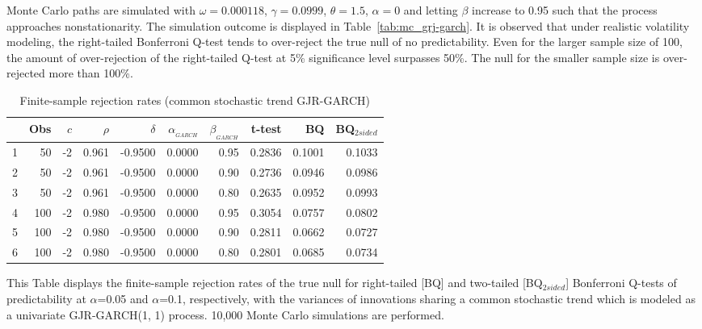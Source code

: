 \documentclass{article}
\begin{document}
Monte Carlo paths are simulated with $\omega = 0.000118$, $\gamma=0.0999$, $\theta=1.5$, $\alpha=0$ and letting $\beta$ increase to 0.95 such that the process approaches nonstationarity. The simulation outcome is displayed in Table~\vref{tab:mc_grj-garch}. It is observed that under realistic volatility modeling, the right-tailed Bonferroni Q-test tends to over-reject the true null of no predictability. Even for the larger sample size of 100, the amount of over-rejection of the right-tailed Q-test at 5\% significance level surpasses 50\%. The null for the smaller sample size is over-rejected more than 100\%.

\begin{table}[h!]
\centering
\caption{Finite-sample rejection rates (common stochastic trend GJR-GARCH)}
\label{tab:mc_grj-garch}
\begin{threeparttable}
\begin{tabular}{rrrrrrrrrr}
  \hline
  & Obs & $c$ & $\rho$ & $\delta$ & $\alpha_{_{GARCH}}$ & $\beta_{_{GARCH}}$ & t-test &BQ& BQ$_{{2sided}}$ \\ 
  \hline
1 & 50 & -2 & 0.961 & -0.9500 & 0.0000 & 0.95 & 0.2836 & 0.1001 & 0.1033 \\ 
  2 & 50 & -2 & 0.961 & -0.9500 & 0.0000 & 0.90 & 0.2736 & 0.0946 & 0.0986 \\ 
  3 & 50 & -2 & 0.961 & -0.9500 & 0.0000 & 0.80 & 0.2635 & 0.0952 & 0.0993 \\ 
  4 & 100 & -2 & 0.980 & -0.9500 & 0.0000 & 0.95 & 0.3054 & 0.0757 & 0.0802 \\ 
  5 & 100 & -2 & 0.980 & -0.9500 & 0.0000 & 0.90 & 0.2811 & 0.0662 & 0.0727 \\ 
  6 & 100 & -2 & 0.980 & -0.9500 & 0.0000 & 0.80 & 0.2801 & 0.0685 & 0.0734 \\ 
   \hline
\end{tabular}
 \begin{tablenotes}
 \small
\item This Table displays the finite-sample rejection rates of the true null for right-tailed [BQ] and two-tailed  [BQ$_{{2sided}}$] Bonferroni Q-tests of predictability at $\alpha$=0.05 and $\alpha$=0.1, respectively, with the variances of innovations sharing a common stochastic trend which is modeled as a univariate GJR-GARCH(1, 1) process. 10,000 Monte Carlo simulations are performed.
\end{tablenotes}
\end{threeparttable}
\end{table}
\end{document}
